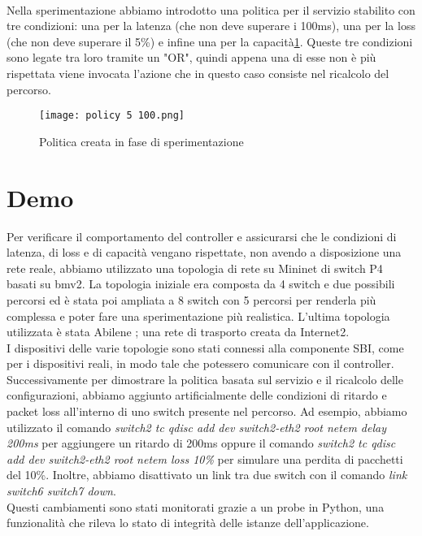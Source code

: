 \\Nella sperimentazione abbiamo introdotto una politica per il servizio stabilito con tre condizioni: una per la latenza (che non deve superare i 100ms), una per la loss (che non deve superare il 5\%) 
e infine una per la capacità\ref{fig:policy}.
Queste tre condizioni sono legate tra loro tramite un "OR", quindi appena una di esse non è più rispettata viene invocata l'azione che in questo caso consiste nel ricalcolo del percorso.
\begin{figure}[h]
    \centering
   \texttt{[image: policy 5 100.png]}
    \caption{Politica creata in fase di sperimentazione}
    \label{fig:policy}
\end{figure}

\section{Demo}
Per verificare il comportamento del controller e assicurarsi che le condizioni di latenza, di loss e di capacità vengano rispettate, 
non avendo a disposizione una rete reale, abbiamo utilizzato una topologia di rete su Mininet di switch P4 basati su bmv2\cite{bmv2}.
La topologia iniziale era composta da 4 switch e due possibili percorsi ed è stata poi ampliata a 8 switch con 5 percorsi per renderla più complessa e poter fare una sperimentazione più realistica.
L'ultima topologia utilizzata è stata Abilene \cite{abilene}; una rete di trasporto creata da Internet2.
\\I dispositivi delle varie topologie sono stati connessi alla componente SBI, come per i dispositivi reali, in modo tale che potessero comunicare con il controller.
Successivamente per dimostrare la politica basata sul servizio e il ricalcolo delle configurazioni, abbiamo aggiunto artificialmente delle condizioni di ritardo e packet loss all’interno di uno switch presente nel percorso. 
Ad esempio, abbiamo utilizzato il comando \textit{switch2 tc qdisc add dev switch2-eth2 root netem delay 200ms} per aggiungere un ritardo di 200ms oppure il comando \textit{switch2 tc qdisc add dev switch2-eth2 root netem loss 10\%}
 per simulare una perdita di pacchetti del 10\%. Inoltre, abbiamo disattivato un link tra due switch con il comando \textit{link switch6 switch7 down}.
\\Questi cambiamenti sono stati monitorati grazie a un probe in Python, una funzionalità che rileva lo stato di integrità delle istanze dell'applicazione.
